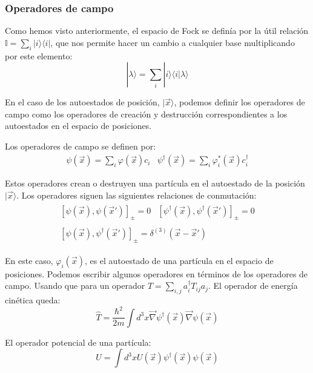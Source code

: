 \documentclass[12pt,twoside]{article}
\begin{document}
\subsubsection{Operadores de campo}

Como hemos visto anteriormente, el espacio de Fock se definía por la útil relación $\mathbb{I} = \sum_i|i\rangle\langle i|$, que nos permite hacer un cambio a cualquier base multiplicando por este elemento:
$$
|\lambda\rangle = \sum_i |i\rangle\langle i|\lambda\rangle
$$

En el caso de los autoestados de posición, $|\vec{x}\rangle$, podemos definir los operadores de campo como los operadores de creación y destrucción correspondientes a los autoestados en el espacio de posiciones.

Los operadores de campo se definen por:
\begin{equation}
\begin{array}{cc}
\psi(\vec{x}) = \sum_i \varphi (\vec{x}) c_i & \psi^{\dagger} (\vec{x}) = \sum_i \varphi_i^* (\vec{x}) c_i^{\dagger}
\end{array}
\label{eq:FieldOps}
\end{equation}

Estos operadores crean o destruyen una partícula en el autoestado de la posición $|\vec{x}\rangle$. Los operadores siguen las siguientes relaciones de conmutación:
\begin{align*}
\begin{array}{cc}
[\psi(\vec{x}), \psi(\vec{x}')]_{\pm} = 0 & [\psi^{\dagger}(\vec{x}), \psi^{\dagger}(\vec{x}')]_{\pm} = 0
\end{array} \\
\begin{array}{c}
[\psi(\vec{x}), \psi^{\dagger}(\vec{x}')]_{\pm} = \delta^{(3)} (\vec{x} - \vec{x}')
\end{array}
\end{align*}

En este caso, $\varphi_i(\vec{x})$, es el autoestado de una partícula en el espacio de posiciones. Podemos escribir algunos operadores en términos de los operadores de campo. Usando que para un operador $T = \sum_{i,j} a_i^{\dagger} T_{ij} a_j$. El operador de energía cinética queda:
$$
\hat{T} = \frac{\hbar^2}{2m} \int d^3 x \vec{\nabla} \psi^{\dagger} (\vec{x}) \vec{\nabla} \psi(\vec{x})
$$

El operador potencial de una partícula:
$$
\hat{U} = \int d^3x U(\vec{x}) \psi^{\dagger} (\vec{x}) \psi(\vec{x})
$$
\end{document}
